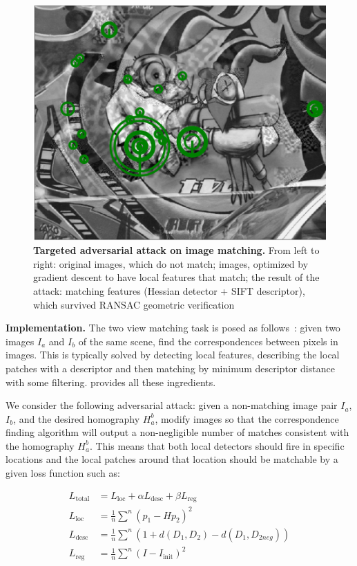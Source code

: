\begin{figure}[tb]
\begin{center}
        \includegraphics[width=0.32\linewidth]{main/chapter03/data/wbs/0_inl.jpg} 
    \end{center}
    \caption[Targeted adversarial attack on image matching]{{\bf Targeted adversarial attack on image matching.} From left to right: original images, which do not match; images, optimized by gradient descent to have local features that match; the result of the attack: matching features (Hessian detector + SIFT descriptor), which survived RANSAC geometric verification}
    \label{fig:wbs}
\end{figure}

\textbf{Implementation.}
The two view matching task is posed as follows~\citep{Pritchett1998}: given two images $I_{a}$ and $I_{b}$ of the same scene, find the correspondences between pixels in images. This is typically solved by detecting local features, describing the local patches with a descriptor and then matching by minimum descriptor distance with some filtering. \lib{} provides all these ingredients. 

We consider the following adversarial attack: given a non-matching image pair $I_{a}$, $I_{b}$, and the desired homography $H_a^b$, modify images so that the correspondence finding algorithm will output a non-negligible number of matches consistent with the homography $H_a^b$. This means that both local detectors should fire in specific locations and the local patches around that location should be matchable by a given loss function such as:

\begin{align}
	\label{eq:adversarial:loss total}
	L_{\text{total}} &= L_{\text{loc}} + \alpha L_{\text{desc}} + \beta L_{\text{reg}}\\
	\label{eq:adversarial:loss loc}
	L_{\text{loc}} &= \frac{1}{n} \sum\limits^{n} (p_1 - H p_2)^2 \\
   \label{eq:adversarial:loss desc}
	L_{\text{desc}} &= \frac{1}{n} \sum\limits^{n} (1 + d(D_1, D_2) - d(D_1, D_{2neg})) \\
	\label{eq:adversarial:loss reg}
	L_{\text{reg}} &= \frac{1}{n} \sum\limits^{n} (I - I_{\text{init}})^2 
\end{align}

